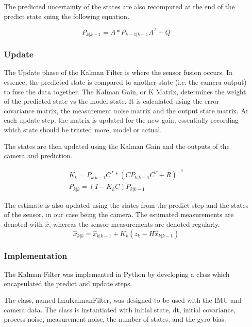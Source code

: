 \documentclass[bare_jrnl_transmag]{subfiles}
\begin{document}
The predicted uncertainty of the states are also recomputed at the end of the predict state suing the following equation.

\begin{equation*}
    P_{k|k-1} = A * P_{k-1|k-1} A^T + Q
\end{equation*}


    
\subsubsection{Update}
The Update phase of the Kalman Filter is where the sensor fusion occurs. In essence, the predicted state is compared to another state (i.e. the camera output) to fuse the data together. 
The Kalman Gain, or K Matrix, determines the weight of the predicted state vs the model state. It is calculated using the error covariance matrix, the measurement noise matrix and the output state matrix. 
At each update step, the matrix is updated for the new gain, essentially recording which state should be trusted more, model or actual.

The states are then updated using the Kalman Gain and the outputs of the camera and prediction.

\begin{eqnarray*}
    K_k = P_{k|k-1} C^T * (C P_{k|k-1} C^T + R)^{-1} \\
    P_{k|k} = (I - K_k C) P_{k|k-1}
\end{eqnarray*}

The estimate is also updated using the states from the predict step and the states of the sensor, in our case being the camera. 
The estimated measurements are denoted with $\hat{x}$, whereas the sensor measurements are denoted regularly. 
\begin{equation*}
    \hat{x}_{k|k} = \hat{x}_{k|k-1} + K_k (z_k - H \hat{x}_{k|k-1})
\end{equation*}

\subsubsection{Implementation}

The Kalman Filter was implemented in Python by developing a class which encapsulated the predict and update steps. 

The class, named ImuKalmanFilter, was designed to be used with the IMU and camera data. The class is instantiated with initial state, dt, initial covariance, process noise, measurement noise, the number of states, and the gyro bias. 
\end{document}
